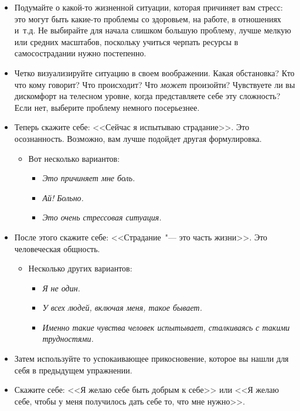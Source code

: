 \begin{itemize}
	\item Подумайте о какой-то жизненной ситуации, которая причиняет вам стресс: это могут быть какие-то проблемы со здоровьем, на работе, в отношениях и~т.\:д. Не выбирайте для начала слишком большую проблему, лучше мелкую или средних масштабов, поскольку учиться черпать ресурсы в самосострадании нужно постепенно.
	\item Четко визуализируйте ситуацию в своем воображении. Какая обстановка? Кто что кому говорит? Что происходит? Что \textit{может} произойти? Чувствуете ли вы дискомфорт на телесном уровне, когда представляете себе эту сложность? Если нет, выберите проблему немного посерьезнее.
	\item Теперь скажите себе: <<Сейчас я испытываю страдание>>. Это осознанность. Возможно, вам лучше подойдет другая формулировка.
	\begin{itemize}
		\item Вот несколько вариантов:
		\begin{itemize}
			\item \textit{Это причиняет мне боль.}
			\item \textit{Ай! Больно.}
			\item \textit{Это очень стрессовая ситуация.}
		\end{itemize}
	\end{itemize}
	\item После этого скажите себе: <<Страдание~"--- это часть жизни>>. Это человеческая общность.
	\begin{itemize}
		\item Несколько других вариантов:
		\begin{itemize}
			\item \textit{Я не один.}
			\item \textit{У всех людей, включая меня, такое бывает.}
			\item \textit{Именно такие чувства человек испытывает, сталкиваясь с такими трудностями.}
		\end{itemize}
	\end{itemize}
	\item Затем используйте то успокаивающее прикосновение, которое вы нашли для себя в предыдущем упражнении. 
	\item Скажите себе: <<Я желаю себе быть добрым к себе>> или <<Я желаю себе, чтобы у меня получилось дать себе то, что мне нужно>>.


\end{itemize}
